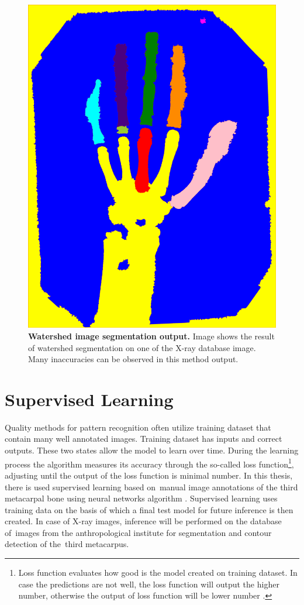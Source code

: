 \begin{figure}[!ht]
    \centering
    \includegraphics[width=.35\textwidth]{obrazky-figures/watershed2.pdf}
     \caption{\textbf{Watershed image segmentation output.} Image shows the result of watershed segmentation on one of the X-ray database image. Many inaccuracies can be observed in this method output.}
    \label{watershed-img}
\end{figure}

\section{Supervised Learning}
Quality methods for pattern recognition often utilize training dataset that contain many well annotated images. Training dataset has inputs and correct outputs. These two states allow the model to learn over time. During the learning process the algorithm measures its accuracy through the so-called loss function\footnote{Loss function evaluates how good is the model created on training dataset. In case the predictions are not well, the loss function will output the higher number, otherwise the output of loss function will be lower number \cite{loss-function}.}, adjusting until the output of the loss function is minimal number. In this thesis, there is used supervised learning based on~manual image annotations of the third metacarpal bone using neural networks algorithm \cite{ibm-supervised-learning, supervised-learning-paper}. Supervised learning uses training data on the basis of which a final test model for future inference is then created. In case of X-ray images, inference will be performed on the database of~images from the anthropological institute for segmentation and contour detection of the~third metacarpus.

